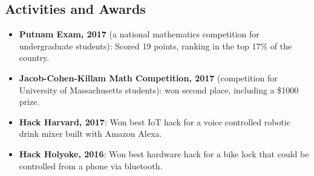 \documentclass{article}
\begin{document}
    \subsection*{Activities and Awards}
    	\begin{itemize}[noitemsep,leftmargin=40pt]
        	\item \textbf{Putnam Exam, 2017} (a national mathematics competition for undergraduate students): Scored 19 points, ranking in the top 17\% of the country.
        	\item \textbf{Jacob-Cohen-Killam Math Competition, 2017} (competition for University of Massachusetts students): won second place, including a \$1000 prize.
            \item \textbf{Hack Harvard, 2017}: Won best IoT hack for a voice controlled robotic drink mixer built with Amazon Alexa.
            \item \textbf{Hack Holyoke, 2016}: Won best hardware hack for a bike lock that could be controlled from a phone via bluetooth.
        \end{itemize}
\end{document}
